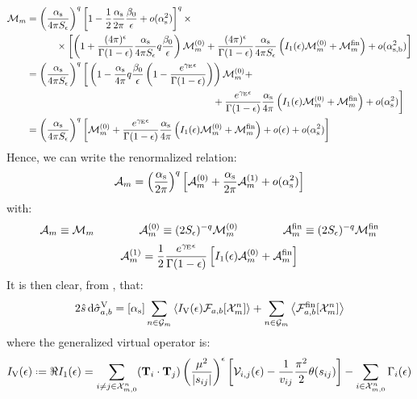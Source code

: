 \begin{equation*}
  \begin{split}
    \mathcal{M}_m
    & = \left( \frac{\alpha_\text{s}}{4\pi S_\epsilon} \right)^q \left[ 1 - \frac{1}{2} \frac{\alpha_\text{s}}{2\pi} \frac{\beta_0}{\epsilon} + o(\alpha_\text{s}^2) \right]^q \times \\
    & \qquad \quad \times \left[ \left( 1 + \frac{(4\pi)^\epsilon}{\Gamma(1-\epsilon)} \frac{\alpha_\text{s}}{4\pi S_\epsilon} q \frac{\beta_0}{\epsilon} \right) \mathcal{M}_m^{(0)} + \frac{(4\pi)^\epsilon}{\Gamma(1-\epsilon)} \frac{\alpha_\text{s}}{4\pi S_\epsilon} \left( I_1(\epsilon) \mathcal{M}_m^{(0)} + \mathcal{M}_m^\text{fin} \right) + o(\alpha_\text{s,b}^2) \right] \\
    & = \left( \frac{\alpha_\text{s}}{4\pi S_\epsilon} \right)^q \bigg[ \left( 1 - \frac{\alpha_\text{s}}{4\pi} q \frac{\beta_0}{\epsilon} \left( 1 - \frac{e^{\gamma_\text{E}\epsilon}}{\Gamma(1-\epsilon)} \right) \right) \mathcal{M}_m^{(0)} + \\
    & \qquad \qquad \qquad \qquad \qquad \qquad \qquad \qquad \qquad \quad + \frac{e^{\gamma_\text{E}\epsilon}}{\Gamma(1-\epsilon)} \frac{\alpha_\text{s}}{4\pi} \left( I_1(\epsilon) \mathcal{M}_m^{(0)} + \mathcal{M}_m^\text{fin} \right) + o(\alpha_\text{s}^2) \bigg] \\
    & = \left( \frac{\alpha_\text{s}}{4\pi S_\epsilon} \right)^q \left[ \mathcal{M}_m^{(0)} + \frac{e^{\gamma_\text{E}\epsilon}}{\Gamma(1-\epsilon)} \frac{\alpha_\text{s}}{4\pi} \left( I_1(\epsilon) \mathcal{M}_m^{(0)} + \mathcal{M}_m^\text{fin} \right) + o(\epsilon) + o(\alpha_\text{s}^2) \right]
  \end{split}
\end{equation*}
Hence, we can write the renormalized relation:
\begin{equation}
  \mathcal{A}_m = \left( \frac{\alpha_\text{s}}{2\pi} \right)^q \left[ \mathcal{A}_m^{(0)} + \frac{\alpha_\text{s}}{2\pi} \mathcal{A}_m^{(1)} + o(\alpha_\text{s}^2) \right]
\end{equation}
with:
\begin{equation}
  \mathcal{A}_m \equiv \mathcal{M}_m
  \qquad \qquad
  \mathcal{A}_m^{(0)} \equiv (2S_\epsilon)^{-q} \mathcal{M}_m^{(0)}
  \qquad \qquad
  \mathcal{A}_m^\text{fin} \equiv (2S_\epsilon)^{-q} \mathcal{M}_m^\text{fin}
\end{equation}
\begin{equation}
  \mathcal{A}_m^{(1)} = \frac{1}{2} \frac{e^{\gamma_\text{E}\epsilon}}{\Gamma(1-\epsilon)} \left[ I_1(\epsilon) \mathcal{A}_m^{(0)} + \mathcal{A}_m^\text{fin} \right]
\end{equation}
It is then clear, from , that:
\begin{equation}
  2\hat{s}\, \mathrm{d}\hat{\sigma}_{a,b}^\text{V} = [\alpha_\text{s}] \sum_{n \in \mathcal{G}_m} \left\langle I_\text{V}(\epsilon) \mathcal{F}_{a,b}[\mathcal{X}^{n}_{m}] \right\rangle + \sum_{n \in \mathcal{G}_m} \left\langle \mathcal{F}_{a,b}^\text{fin}[\mathcal{X}^{n}_{m}] \right\rangle
\end{equation}
where the generalized virtual operator is:
\begin{equation}
  \ivo(\de) \defeq \Re \ioo(\de) = \sum_{i \neq j \in \fsp{n}{m}} (\cc) \left( \frac{\mu^2}{\abs{s_{ij}}} \right)^\de \left[ \ns_{i,j}(\de) - \frac{1}{v_{ij}} \frac{\pi^2}{2} \theta(s_{ij}) \right] - \sum_{i \in \fsp{n}{m}} \Gamma_i(\de)
\end{equation}

